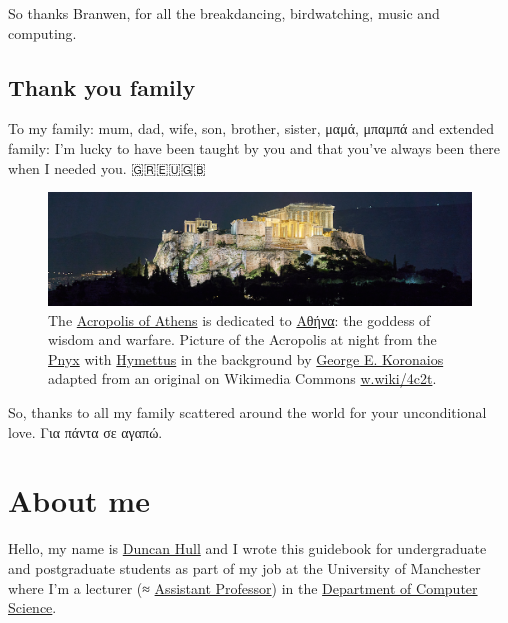\documentclass[
]{book}
\begin{document}
So thanks Branwen, for all the breakdancing, birdwatching, music and computing.

\hypertarget{family}{%
\subsection{Thank you family}\label{family}}

To my family: mum, dad, wife, son, brother, sister, μαμά, μπαμπά and extended family: I'm lucky to have been taught by you and that you've always been there when I needed you. 🇬🇷🇪🇺🇬🇧

\begin{figure}
\includegraphics[width=1\linewidth]{images/acropolis-at-night} \caption{The \href{https://en.wikipedia.org/wiki/Acropolis_of_Athens}{Acropolis of Athens} is dedicated to \href{https://en.wikipedia.org/wiki/Athena}{Αθήνα}: the goddess of wisdom and warfare. Picture of the Acropolis at night from the \href{https://en.wikipedia.org/wiki/Pnyx}{Pnyx} with \href{https://en.wikipedia.org/wiki/Hymettus}{Hymettus} in the background by \href{https://commons.wikimedia.org/wiki/User:George_E._Koronaios}{George E. Koronaios} adapted from an original on Wikimedia Commons \href{https://w.wiki/4c2t}{w.wiki/4c2t}.}\label{fig:acropolis-fig}
\end{figure}



So, thanks to all my family scattered around the world for your unconditional love. Για πάντα σε αγαπώ. 🙏

\hypertarget{duncan}{%
\section{About me}\label{duncan}}

Hello, my name is \href{http://www.cs.man.ac.uk/~hulld/}{Duncan Hull} and I wrote this guidebook for undergraduate and postgraduate students as part of my job at the University of Manchester where I'm a lecturer (≈ \href{https://en.wikipedia.org/wiki/Assistant_professor}{Assistant Professor}) in the \href{https://www.cs.manchester.ac.uk/}{Department of Computer Science}.
\end{document}
